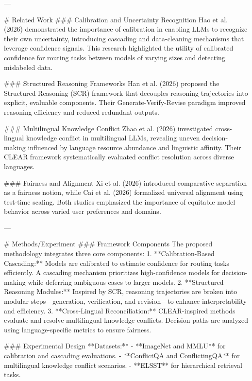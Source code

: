---

# Related Work  
### Calibration and Uncertainty Recognition  
Hao et al. (2026) demonstrated the importance of calibration in enabling LLMs to recognize their own uncertainty, introducing cascading and data-cleaning mechanisms that leverage confidence signals. This research highlighted the utility of calibrated confidence for routing tasks between models of varying sizes and detecting mislabeled data.

### Structured Reasoning Frameworks  
Han et al. (2026) proposed the Structured Reasoning (SCR) framework that decouples reasoning trajectories into explicit, evaluable components. Their Generate-Verify-Revise paradigm improved reasoning efficiency and reduced redundant outputs.

### Multilingual Knowledge Conflict  
Zhao et al. (2026) investigated cross-lingual knowledge conflict in multilingual LLMs, revealing uneven decision-making influenced by language resource abundance and linguistic affinity. Their CLEAR framework systematically evaluated conflict resolution across diverse languages.

### Fairness and Alignment  
Xi et al. (2026) introduced comparative separation as a fairness notion, while Cai et al. (2026) formalized universal alignment using test-time scaling. Both studies emphasized the importance of equitable model behavior across varied user preferences and domains.

---

# Methods/Experiment  
### Framework Components  
The proposed methodology integrates three core components:  
1. **Calibration-Based Cascading:** Models are calibrated to estimate confidence for routing tasks efficiently. A cascading mechanism prioritizes high-confidence models for decision-making while deferring ambiguous cases to larger models.  
2. **Structured Reasoning Modules:** Inspired by SCR, reasoning trajectories are broken into modular steps—generation, verification, and revision—to enhance interpretability and efficiency.  
3. **Cross-Lingual Reconciliation:** CLEAR-inspired methods evaluate and resolve multilingual knowledge conflicts. Decision paths are analyzed using language-specific metrics to ensure fairness.

### Experimental Design  
**Datasets:**  
- **ImageNet and MMLU** for calibration and cascading evaluations.  
- **ConflictQA and ConflictingQA** for multilingual knowledge conflict scenarios.  
- **ELSST** for hierarchical retrieval tasks.  

